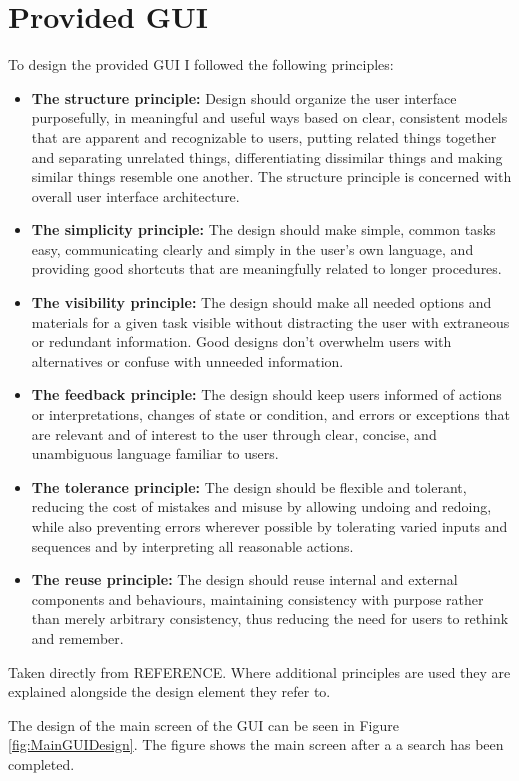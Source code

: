 \section{Provided GUI}
\label{sec:provgui}
To design the provided GUI I followed the following principles:
\begin{itemize}
 \item \textbf{The structure principle:} Design should organize the user interface purposefully, in meaningful and useful ways based on clear, consistent models that are apparent and recognizable to users, putting related things together and separating unrelated things, differentiating dissimilar things and making similar things resemble one another. 
The structure principle is concerned with overall user interface architecture.
\item \textbf{The simplicity principle:} The design should make simple, common tasks easy, communicating clearly and simply in the user's own language, and providing good shortcuts that are meaningfully related to longer procedures.
\item \textbf{The visibility principle:} The design should make all needed options and materials for a given task visible without distracting the user with extraneous or redundant information. 
Good designs don't overwhelm users with alternatives or confuse with unneeded information.
\item \textbf{The feedback principle:} The design should keep users informed of actions or interpretations, changes of state or condition, and errors or exceptions that are relevant and of interest to the user through clear, concise, and unambiguous language familiar to users.
\item \textbf{The tolerance principle:} The design should be flexible and tolerant, reducing the cost of mistakes and misuse by allowing undoing and redoing, while also preventing errors wherever possible by tolerating varied inputs and sequences and by interpreting all reasonable actions.
\item \textbf{The reuse principle:} The design should reuse internal and external components and behaviours, maintaining consistency with purpose rather than merely arbitrary consistency, thus reducing the need for users to rethink and remember.
\end{itemize}
Taken directly from REFERENCE.
Where additional principles are used they are explained alongside the design element they refer to.

The design of the main screen of the GUI can be seen in Figure \ref{fig:MainGUIDesign}.
The figure shows the main screen after a a search has been completed.

